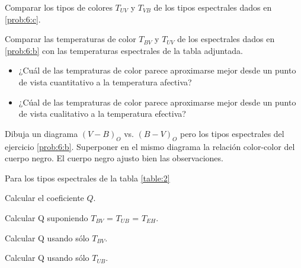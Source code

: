 \documentclass[12pt,a4paper]{practice}
\begin{document}
\begin{problem}
        \begin{ppart}\label{prob:6:d}
            Comparar los tipos de colores $T_{UV}$ y $T_{VB}$ de los tipos espectrales dados en \ref{prob:6:c}.
        \end{ppart}

        \begin{ppart}\label{prob:6:e}
            Comparar las temperaturas de color $T_{BV}$ y $T_{UV}$ de los espectrales dados en \ref{prob:6:b} con las temperaturas espectrales de la tabla adjuntada.

            \begin{itemize}
                \item ¿Cuál de las tempraturas de color parece aproximarse mejor desde un punto de vista cuantitativo a la temperatura afectiva?
                \item ¿Cúal de las tempraturas de color parece aproximarse mejor desde un punto de vista cualitativo a la temperatura efectiva?
            \end{itemize}
        \end{ppart}
    \end{problem}

    \begin{problem}\label{prob:7}
        Dibuja un diagrama $\left(V-B\right)_O$ vs. $\left(B-V\right)_O$ pero los tipos espectrales del ejercicio \ref{prob:6:b}. Superponer en el mismo diagrama la relación color-color del cuerpo negro. El cuerpo negro ajusto bien las observaciones.
    \end{problem}

    \begin{problem}\label{prob:8}
        Para los tipos espectrales de la tabla \ref{table:2}

            \begin{ppart}\label{prob:8:a}
                Calcular el coeficiente $Q$.
            \end{ppart}

            \begin{ppart}\label{prob:8:b}
                Calcular Q suponiendo $T_{BV}$ = $T_{UB}$ = $T_{EH}$.
            \end{ppart}

            \begin{ppart}\label{prob:8:c}
                Calcular Q usando sólo $T_{BV}$.
            \end{ppart}

            \begin{ppart}\label{prob:8:d}
                Calcular Q usando sólo $T_{UB}$.
            \end{ppart}
    \end{problem}
\end{document}
